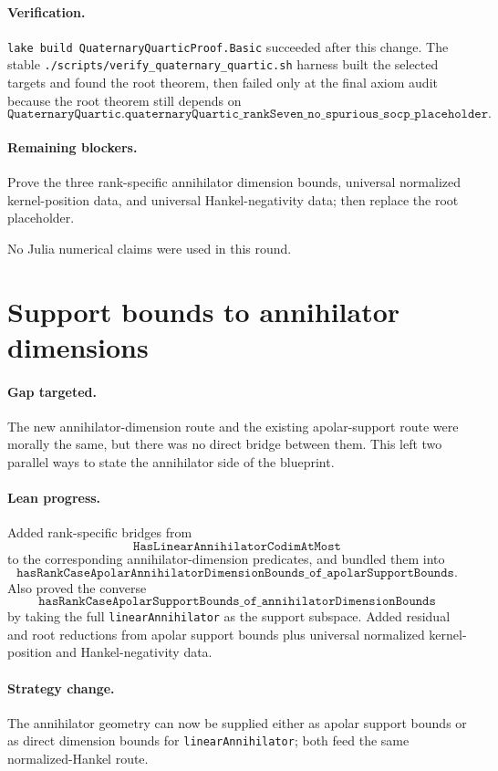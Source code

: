 \documentclass[11pt]{article}
\begin{document}
\paragraph{Verification.}
\texttt{lake build QuaternaryQuarticProof.Basic} succeeded after this change.
The stable \texttt{./scripts/verify\_quaternary\_quartic.sh} harness built the
selected targets and found the root theorem, then failed only at the final axiom
audit because the root theorem still depends on
\[
\texttt{QuaternaryQuartic.quaternaryQuartic\_rankSeven\_no\_spurious\_socp\_placeholder}.
\]

\paragraph{Remaining blockers.}
Prove the three rank-specific annihilator dimension bounds, universal
normalized kernel-position data, and universal Hankel-negativity data; then
replace the root placeholder.

No Julia numerical claims were used in this round.

\section*{Support bounds to annihilator dimensions}

\paragraph{Gap targeted.}
The new annihilator-dimension route and the existing apolar-support route were
morally the same, but there was no direct bridge between them.  This left two
parallel ways to state the annihilator side of the blueprint.

\paragraph{Lean progress.}
Added rank-specific bridges from
\[
\texttt{HasLinearAnnihilatorCodimAtMost}
\]
to the corresponding annihilator-dimension predicates, and bundled them into
\[
\texttt{hasRankCaseApolarAnnihilatorDimensionBounds\_of\_apolarSupportBounds}.
\]
Also proved the converse
\[
\texttt{hasRankCaseApolarSupportBounds\_of\_annihilatorDimensionBounds}
\]
by taking the full \texttt{linearAnnihilator} as the support subspace.  Added
residual and root reductions from apolar support bounds plus universal
normalized kernel-position and Hankel-negativity data.

\paragraph{Strategy change.}
The annihilator geometry can now be supplied either as apolar support bounds or
as direct dimension bounds for \texttt{linearAnnihilator}; both feed the same
normalized-Hankel route.
\end{document}
